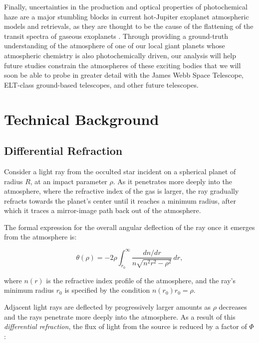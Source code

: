 \documentclass[preprint]{aastex}
\newcommand{\beq}{\begin{equation}}
\newcommand{\eeq}{\end{equation}}
\begin{document}
\begin{multicols}{2}
Finally, uncertainties in the production and optical properties of
photochemical haze are a major stumbling blocks in current hot-Jupiter
exoplanet atmospheric models and retrievals, as they are thought to be the
cause of the flattening of the transit spectra of gaseous exoplanets
\citep{Fraine13}.  Through providing a ground-truth
understanding of the atmosphere of one of our local giant planets whose
atmospheric chemistry is also photochemically driven, our analysis will help
future studies constrain the atmospheres of these exciting bodies that we will
soon be able to probe in greater detail with the James Webb Space Telescope,
ELT-class ground-based telescopes, and other future telescopes.

\vspace{-9mm}
\section{Technical Background}

\vspace{-3mm}
\subsection{Differential Refraction}
\vspace{-3mm}

Consider a light ray from the occulted star incident on a spherical planet of
radius $R$, at an impact parameter $\rho$. As it penetrates more deeply into
the atmosphere, where the refractive index of the gas is larger, the ray
gradually refracts towards the planet's center until it reaches a minimum
radius, after which it traces a mirror-image path back out of the atmosphere.  

The formal expression for the overall angular deflection of the ray once it
emerges from the atmosphere is:

\beq 
 \theta(\rho) = -2\rho \int_{r_0}^\infty \frac{dn/dr}{n\sqrt{n^2r^2 - \rho^2}}\, dr,
\label{eq:bending_angle}
\eeq

\noindent where $n(r)$  is the refractive index profile of the atmosphere,
and the ray's minimum radius $r_0$ is specified by the condition $n(r_0)r_0 = \rho$.

Adjacent light rays are deflected by progressively larger amounts as $\rho$
decreases and the rays penetrate more deeply into the atmosphere. As a result
of this {\it differential refraction}, the flux of light from the source is
reduced by a factor of $\Phi$:


\end{multicols}
\end{document}
